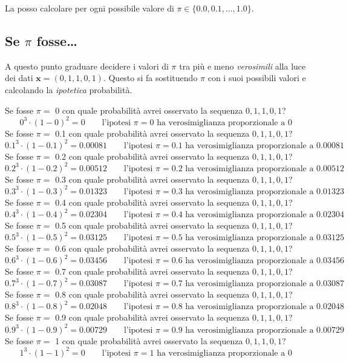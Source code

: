 \documentclass[
  11pt,
]{book}
\theoremstyle{mytheoremstyle}
\theoremstyle{mydefstyle}
\begin{document}
La posso calcolare per ogni possibile valore di \(\pi\in\{0.0,0.1,...,1.0\}\).

\subsection{\texorpdfstring{Se \(\pi\) fosse\ldots{}}{Se \textbackslash pi fosse\ldots{}}}\label{se-pi-fosse}

A questo punto graduare decidere i valori di \(\pi\) tra più e meno \emph{verosimili}
alla luce dei dati \(\mathbf{x}=(0,1,1,0,1)\). Questo si fa sostituendo \(\pi\) con
i suoi possibili valori e calcolando la \emph{ipotetica} probabilità.

Se fosse \(\pi=\) 0 con quale probabilità avrei osservato la sequenza \(0,1,1,0,1\)?
\[ 
0 ^3\cdot(1- 0 )^2= 0  \qquad\text{l'ipotesi $\pi= 0 $ ha verosimiglianza proporzionale a 0 }
\]
Se fosse \(\pi=\) 0.1 con quale probabilità avrei osservato la sequenza \(0,1,1,0,1\)?
\[ 
0.1 ^3\cdot(1- 0.1 )^2= 0.00081  \qquad\text{l'ipotesi $\pi= 0.1 $ ha verosimiglianza proporzionale a 0.00081 }
\]
Se fosse \(\pi=\) 0.2 con quale probabilità avrei osservato la sequenza \(0,1,1,0,1\)?
\[ 
0.2 ^3\cdot(1- 0.2 )^2= 0.00512  \qquad\text{l'ipotesi $\pi= 0.2 $ ha verosimiglianza proporzionale a 0.00512 }
\]
Se fosse \(\pi=\) 0.3 con quale probabilità avrei osservato la sequenza \(0,1,1,0,1\)?
\[ 
0.3 ^3\cdot(1- 0.3 )^2= 0.01323  \qquad\text{l'ipotesi $\pi= 0.3 $ ha verosimiglianza proporzionale a 0.01323 }
\]
Se fosse \(\pi=\) 0.4 con quale probabilità avrei osservato la sequenza \(0,1,1,0,1\)?
\[ 
0.4 ^3\cdot(1- 0.4 )^2= 0.02304  \qquad\text{l'ipotesi $\pi= 0.4 $ ha verosimiglianza proporzionale a 0.02304 }
\]
Se fosse \(\pi=\) 0.5 con quale probabilità avrei osservato la sequenza \(0,1,1,0,1\)?
\[ 
0.5 ^3\cdot(1- 0.5 )^2= 0.03125  \qquad\text{l'ipotesi $\pi= 0.5 $ ha verosimiglianza proporzionale a 0.03125 }
\]
Se fosse \(\pi=\) 0.6 con quale probabilità avrei osservato la sequenza \(0,1,1,0,1\)?
\[ 
0.6 ^3\cdot(1- 0.6 )^2= 0.03456  \qquad\text{l'ipotesi $\pi= 0.6 $ ha verosimiglianza proporzionale a 0.03456 }
\]
Se fosse \(\pi=\) 0.7 con quale probabilità avrei osservato la sequenza \(0,1,1,0,1\)?
\[ 
0.7 ^3\cdot(1- 0.7 )^2= 0.03087  \qquad\text{l'ipotesi $\pi= 0.7 $ ha verosimiglianza proporzionale a 0.03087 }
\]
Se fosse \(\pi=\) 0.8 con quale probabilità avrei osservato la sequenza \(0,1,1,0,1\)?
\[ 
0.8 ^3\cdot(1- 0.8 )^2= 0.02048  \qquad\text{l'ipotesi $\pi= 0.8 $ ha verosimiglianza proporzionale a 0.02048 }
\]
Se fosse \(\pi=\) 0.9 con quale probabilità avrei osservato la sequenza \(0,1,1,0,1\)?
\[ 
0.9 ^3\cdot(1- 0.9 )^2= 0.00729  \qquad\text{l'ipotesi $\pi= 0.9 $ ha verosimiglianza proporzionale a 0.00729 }
\]
Se fosse \(\pi=\) 1 con quale probabilità avrei osservato la sequenza \(0,1,1,0,1\)?
\[ 
1 ^3\cdot(1- 1 )^2= 0  \qquad\text{l'ipotesi $\pi= 1 $ ha verosimiglianza proporzionale a 0 }
\]
\end{document}
